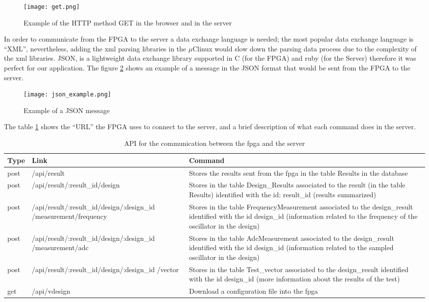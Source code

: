 \begin{figure}[htb]
\centering
\texttt{[image: get.png]}
\caption{Example of the HTTP method GET in the browser and in the server}
\label{fig:get_example}
\end{figure}

In order to communicate from the FPGA to the server a data exchange language is needed; the most popular data exchange language is ``XML'', nevertheless, adding the xml parsing libraries in the $\mu$Clinux
would slow down the parsing data process due to the complexity of the xml libraries. JSON, is a lightweight data exchange library supported in C (for the FPGA) and ruby (for the Server) therefore it was perfect
for our application. The figure \ref{fig:Json_message} shows an example of a message in the JSON format that would be sent from the FPGA to the server.

\begin{figure}[htb]
\centering
\texttt{[image: json\_example.png]}
\caption{Example of a JSON message}
\label{fig:Json_message}
\end{figure}

The table \ref{tab:api_server_fpga} shows the ``URL'' the FPGA uses to connect to the server, and a brief description of what each command does in the server.

\begin{table}
\centering
    \begin{tabular}{ | l | p{7.5cm} | p{5cm}|}
    \hline
    Type & Link & Command   \\ \hline
    post & /api/result & Stores the results sent from the fpga in the table Results in the database\\ \hline
    post & /api/result/:result\_id/design & Stores in the table Design\_Results associated to the result (in the table Results) identified with the id: result\_id (results summarized)\\ \hline
    post & /api/result/:result\_id/design/:design\_id	/measurement/frequency & Stores in the table FrequencyMeasurement associated to the design\_result identified with the id design\_id (information related to the frequency of the oscillator in the design)\\ \hline
    post & /api/result/:result\_id/design/:design\_id	/measurement/adc & Stores in the table AdcMeasurement associated to the design\_result identified with the id design\_id (information related to the sampled oscillator in the design)  \\ \hline
    post & /api/result/:result\_id/design/:design\_id	/vector & Stores in the table Test\_vector associated to the design\_result identified with the id design\_id (more information about the results of the test)\\ \hline
    get & /api/vdesign & Download a configuration file into the fpga\\ \hline
    \end{tabular}
    \caption{API for the communication between the fpga and the server}
    \label{tab:api_server_fpga}
\end{table}



